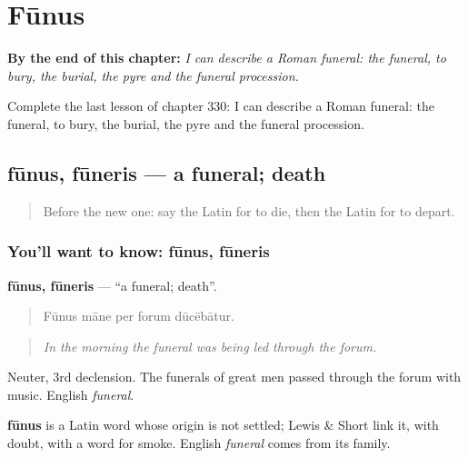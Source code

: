 
\chapter{Fūnus}
\label{ch:la-funus}

\begin{chapteropening}
\textbf{By the end of this chapter:} \emph{I can describe a Roman funeral: the funeral, to bury, the burial, the pyre and the funeral procession.}

Complete the last lesson of chapter 330: I can describe a Roman funeral: the funeral, to bury, the burial, the pyre and the funeral procession.
\end{chapteropening}

\section[fūnus, fūneris]{fūnus, fūneris — a funeral; death}

\label{lesson:LA-C330-funus}



\begin{quote}
Before the new one: say the Latin for to die, then the Latin for to depart.
\end{quote}

\subsection*{You'll want to know: fūnus, fūneris}
\textbf{fūnus, fūneris} — \textquotedblleft{}a funeral; death\textquotedblright{}.

\begin{quote}
Fūnus māne per forum dūcēbātur.
\end{quote}

\begin{quote}
\emph{In the morning the funeral was being led through the forum.}
\end{quote}

Neuter, 3rd declension. The funerals of great men passed through the forum with music. English \emph{funeral}.

\begin{cousinweb}
\textbf{fūnus} is a Latin word whose origin is not settled; Lewis \& Short link it, with doubt, with a word for smoke. English \emph{funeral} comes from its family.
\end{cousinweb}

